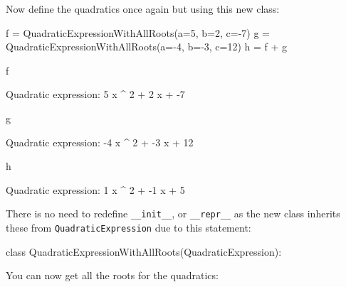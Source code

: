 Now define the quadratics once again but using this new class:




\begin{pyin}
f = QuadraticExpressionWithAllRoots(a=5, b=2, c=-7)
g = QuadraticExpressionWithAllRoots(a=-4, b=-3, c=12)
h = f + g
\end{pyin}







\begin{pyin}
f
\end{pyin}





\begin{raw}
Quadratic expression: 5 x ^ 2 + 2 x + -7
\end{raw}







\begin{pyin}
g
\end{pyin}





\begin{raw}
Quadratic expression: -4 x ^ 2 + -3 x + 12
\end{raw}







\begin{pyin}
h
\end{pyin}





\begin{pyin}
Quadratic expression: 1 x ^ 2 + -1 x + 5
\end{pyin}

\begin{note}
There is no need to redefine \texttt{\_\_init\_\_}, or \texttt{\_\_repr\_\_} as the new
class inherits these from \texttt{QuadraticExpression} due to this statement:
\end{note}

\begin{pyin}
class QuadraticExpressionWithAllRoots(QuadraticExpression):
\end{pyin}



You can now get all the roots for the quadratics:






